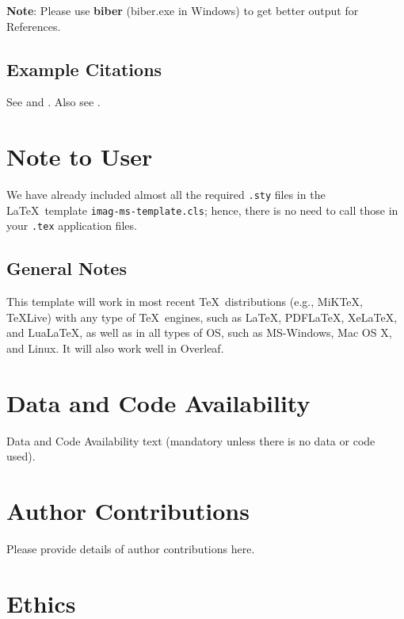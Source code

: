 \documentclass[]{imag-ms-template}
\theoremstyle{plain}
\theoremstyle{remark}
\begin{document}
\bigskip

\textbf{Note}: Please use \textbf{biber} (biber.exe in Windows) to get
better output for References.

\nocite{*}

\subsection{Example Citations}\label{example-citations}

See \textcite{Einstein1905} and \autocite{Goossens1993,Knuth1986}. Also
see \textcite{Chen2023}.

\section{Note to User}\label{note-to-user}

We have already included almost all the required \texttt{.sty} files in
the \LaTeX~template \verb!imag-ms-template.cls!; hence, there is no need
to call those in your \texttt{.tex} application files.

\subsection*{General Notes}\label{general-notes}

\noindent This template will work in most recent \TeX~distributions
(e.g., MiKTeX, TeXLive) with any type of \TeX~engines, such as \LaTeX,
PDF\LaTeX, Xe\LaTeX, and Lua\LaTeX, as well as in all types of OS, such
as MS-Windows, Mac OS X, and Linux. It will also work well in Overleaf.

\section*{Data and Code Availability}

Data and Code Availability text (mandatory unless there is no data or
code used).

\section*{Author Contributions}

Please provide details of author contributions here.

\section*{Ethics}
\end{document}
